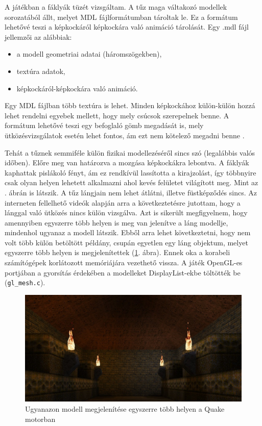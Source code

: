 A játékban a fáklyák tüzét vizsgáltam. A tűz maga váltakozó modellek sorozatából állt, melyet MDL fájlformátumban tároltak le. Ez a formátum lehetővé teszi a képkockáról képkockára való animáció tárolását. Egy .mdl fájl jellemzői az alábbiak:
\begin{itemize} 
\item a modell geometriai adatai (háromszögekben),
\item textúra adatok,
\item képkockáról-képkockára való animáció.
\end{itemize} 
Egy MDL fájlban több textúra is lehet. Minden képkockához külön-külön hozzá lehet rendelni egyebek mellett, hogy mely csúcsok szerepelnek benne. A formátum lehetővé teszi egy befoglaló gömb megadását is, mely ütközésvizsgálatok esetén lehet fontos, ám ezt nem kötelező megadni benne \cite{MDLformat}. 


Tehát a tűznek semmiféle külön fizikai modellezéséről sincs szó (legalábbis valós időben). Előre meg van határozva a mozgása képkockákra lebontva. A fáklyák kaphattak pislákoló fényt, ám ez rendkívül lassította a kirajzolást, így többnyire csak olyan helyen lehetett alkalmazni ahol kevés felületet világított meg. Mint az . ábrán is látszik. A tűz lángjain nem lehet átlátni, illetve füstképződés sincs. Az interneten fellelhető videók alapján arra a következtetésre jutottam, hogy a lánggal való ütközés nincs külön vizsgálva. Azt is sikerült megfigyelnem, hogy amennyiben egyszerre több helyen is meg van jelenítve a láng modellje, mindenhol ugyanaz a modell látszik. Ebből arra lehet következtetni, hogy nem volt több külön betöltött példány, csupán egyetlen egy láng objektum, melyet egyszerre több helyen is megjelenítettek (\ref{fig:quakeTorch}. ábra). Ennek oka a korabeli számítógépek korlátozott memóriájára vezethető vissza. A játék OpenGL-es portjában a gyorsítás érdekében a modelleket DisplayList-ekbe töltötték be (\texttt{gl\_mesh.c}).

\begin{figure}[h]
\centering
\includegraphics[width=\textwidth]{kepek/quake_torches2.jpg}
\caption{Ugyanazon modell megjelenítése egyszerre több helyen a Quake motorban}
\label{fig:quakeTorch}
\end{figure}


